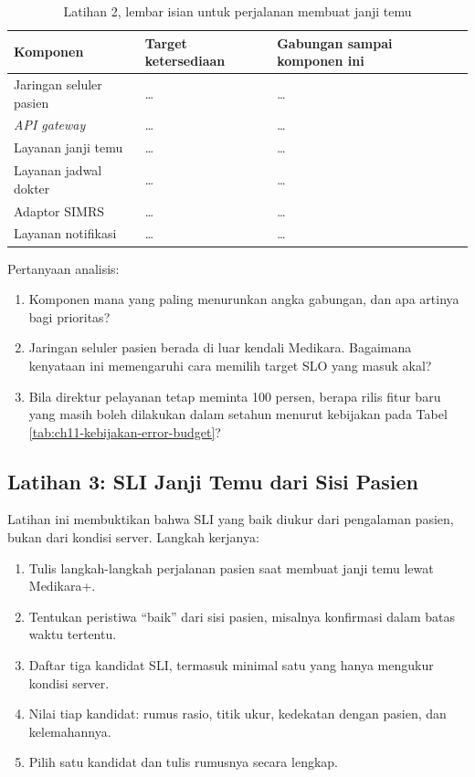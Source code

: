 \begin{table}[!htb]
  \centering
  \caption{Latihan 2, lembar isian untuk perjalanan membuat janji temu}
  \label{tab:ch11-lat2-hasil}
  \footnotesize
  \begin{tabularx}{\textwidth}{>{\raggedright\arraybackslash}X >{\raggedright\arraybackslash}p{2.6cm} >{\raggedright\arraybackslash}p{3.4cm}}
    \hline
    \textbf{Komponen} & \textbf{Target ketersediaan} & \textbf{Gabungan sampai komponen ini} \\ \hline
    Jaringan seluler pasien & \dots & \dots \\ \hline
    \textit{API gateway} & \dots & \dots \\ \hline
    Layanan janji temu & \dots & \dots \\ \hline
    Layanan jadwal dokter & \dots & \dots \\ \hline
    Adaptor SIMRS & \dots & \dots \\ \hline
    Layanan notifikasi & \dots & \dots \\ \hline
  \end{tabularx}
\end{table}

Pertanyaan analisis:
\begin{enumerate}
  \item Komponen mana yang paling menurunkan angka gabungan, dan apa artinya bagi prioritas?
  \item Jaringan seluler pasien berada di luar kendali Medikara. Bagaimana kenyataan ini
        memengaruhi cara memilih target SLO yang masuk akal?
  \item Bila direktur pelayanan tetap meminta 100 persen, berapa rilis fitur baru yang masih boleh
        dilakukan dalam setahun menurut kebijakan pada Tabel \ref{tab:ch11-kebijakan-error-budget}?
\end{enumerate}

\subsection*{Latihan 3: SLI Janji Temu dari Sisi Pasien}

Latihan ini membuktikan bahwa SLI yang baik diukur dari pengalaman pasien, bukan dari kondisi
server. Langkah kerjanya:
\begin{enumerate}
  \item Tulis langkah-langkah perjalanan pasien saat membuat janji temu lewat Medikara+.
  \item Tentukan peristiwa ``baik'' dari sisi pasien, misalnya konfirmasi dalam batas waktu tertentu.
  \item Daftar tiga kandidat SLI, termasuk minimal satu yang hanya mengukur kondisi server.
  \item Nilai tiap kandidat: rumus rasio, titik ukur, kedekatan dengan pasien, dan kelemahannya.
  \item Pilih satu kandidat dan tulis rumusnya secara lengkap.
\end{enumerate}

